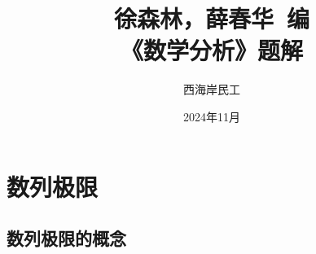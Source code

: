 \documentclass[utf8]{book}
\begin{document}
\title{\heiti 徐森林，薛春华~编 \\ 《数学分析》题解}
\author{\fangsong 西海岸民工}
\date{2024年11月}

\frontmatter
\maketitle


\renewcommand\contentsname{目~录}
\tableofcontents

\mainmatter


\chapter{数列极限}

\section{数列极限的概念}
\end{document}
